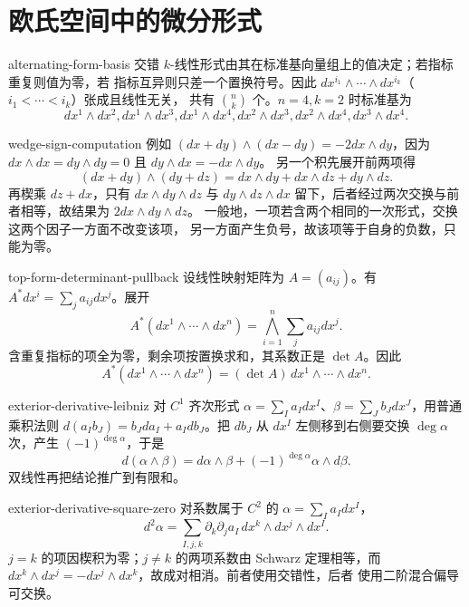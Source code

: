 \chapter{欧氏空间中的微分形式}
\label{chap:euclidean-differential-forms-solutions}

\begin{solution}{alternating-form-basis}
交错 $k$-线性形式由其在标准基向量组上的值决定；若指标重复则值为零，若
指标互异则只差一个置换符号。因此
$dx^{i_1}\wedge\cdots\wedge dx^{i_k}$（$i_1<\cdots<i_k$）张成且线性无关，
共有 $\binom nk$ 个。$n=4,k=2$ 时标准基为
\[
 dx^1\wedge dx^2,dx^1\wedge dx^3,dx^1\wedge dx^4,
 dx^2\wedge dx^3,dx^2\wedge dx^4,dx^3\wedge dx^4.
\]
\end{solution}

\begin{solution}{wedge-sign-computation}
例如
$(dx+dy)\wedge(dx-dy)=-2dx\wedge dy$，因为
$dx\wedge dx=dy\wedge dy=0$ 且 $dy\wedge dx=-dx\wedge dy$。
另一个积先展开前两项得
\[
 (dx+dy)\wedge(dy+dz)=dx\wedge dy+dx\wedge dz+dy\wedge dz.
\]
再楔乘 $dz+dx$，只有 $dx\wedge dy\wedge dz$ 与
$dy\wedge dz\wedge dx$ 留下，后者经过两次交换与前者相等，故结果为
$2dx\wedge dy\wedge dz$。
一般地，一项若含两个相同的一次形式，交换这两个因子一方面不改变该项，
另一方面产生负号，故该项等于自身的负数，只能为零。
\end{solution}

\begin{solution}{top-form-determinant-pullback}
设线性映射矩阵为 $A=(a_{ij})$。有
$A^*dx^i=\sum_j a_{ij}dx^j$。展开
\[
 A^*(dx^1\wedge\cdots\wedge dx^n)
 =\bigwedge_{i=1}^n\sum_ja_{ij}dx^j.
\]
含重复指标的项全为零，剩余项按置换求和，其系数正是 $\det A$。因此
\[
 A^*(dx^1\wedge\cdots\wedge dx^n)
 =(\det A)\,dx^1\wedge\cdots\wedge dx^n.
\]
\end{solution}

\begin{solution}{exterior-derivative-leibniz}
对 $C^1$ 齐次形式 $\alpha=\sum_Ia_I dx^I$、$\beta=\sum_Jb_Jdx^J$，用普通乘积法则
$d(a_Ib_J)=b_Jda_I+a_Idb_J$。把 $db_J$ 从 $dx^I$ 左侧移到右侧要交换
$\deg\alpha$ 次，产生 $(-1)^{\deg\alpha}$，于是
\[
 d(\alpha\wedge\beta)=d\alpha\wedge\beta
 +(-1)^{\deg\alpha}\alpha\wedge d\beta.
\]
双线性再把结论推广到有限和。
\end{solution}

\begin{solution}{exterior-derivative-square-zero}
对系数属于 $C^2$ 的 $\alpha=\sum_Ia_I dx^I$，
\[
 d^2\alpha=\sum_{I,j,k}\partial_k\partial_ja_I
 \,dx^k\wedge dx^j\wedge dx^I.
\]
$j=k$ 的项因楔积为零；$j\ne k$ 的两项系数由 Schwarz 定理相等，而
$dx^k\wedge dx^j=-dx^j\wedge dx^k$，故成对相消。前者使用交错性，后者
使用二阶混合偏导可交换。
\end{solution}

